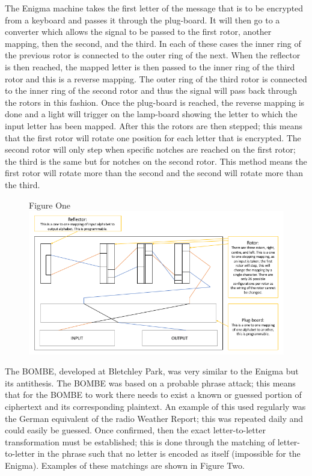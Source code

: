 \documentclass[12pt,a4paper]{article}
\begin{document}
The Enigma machine takes the first letter of the message that is to be encrypted from a keyboard and passes it through the plug-board. It will then go to a converter which allows the signal to be passed to the first rotor, another mapping, then the second, and the third. In each of these cases the inner ring of the previous rotor is connected to the outer ring of the next. When the reflector is then reached, the mapped letter is then passed to the inner ring of the third rotor and this is a reverse mapping. The outer ring of the third rotor is connected to the inner ring of the second rotor and thus the signal will pass back through the rotors in this fashion. Once the plug-board is reached, the reverse mapping is done and a light will trigger on the lamp-board showing the letter to which the input letter has been mapped. After this the rotors are then stepped; this means that the first rotor will rotate one position for each letter that is encrypted. The second rotor will only step when specific notches are reached on the first rotor; the third is the same but for notches on the second rotor. This method means the first rotor will rotate more than the second and the second will rotate more than the third.\\

\begin{figure}[H]
\centering
Figure One
\includegraphics[width=\textwidth]{enigmaDiagram.png}
\end{figure}

The BOMBE, developed at Bletchley Park, was very similar to the Enigma but its antithesis. The BOMBE was based on a probable phrase attack; this means that for the BOMBE to work there needs to exist a known or guessed portion of ciphertext and its corresponding plaintext. An example of this  used regularly was the German equivalent of the radio Weather Report; this was repeated daily and could easily be guessed. Once confirmed, then the exact letter-to-letter transformation must be established; this is done through the matching of letter-to-letter in the phrase such that no letter is encoded as itself (impossible for the Enigma). Examples of these matchings are shown in Figure Two.
\end{document}
